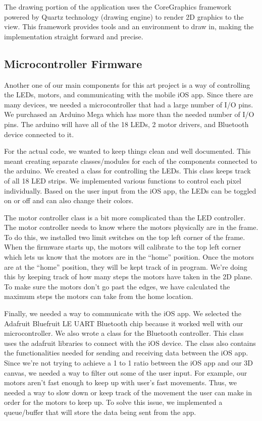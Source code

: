 \documentclass[11pt]{IEEEtran}
\begin{document}
The drawing portion of the application uses the CoreGraphics framework powered by Quartz technology (drawing engine) to render 2D graphics to the view. This framework provides tools and an environment to draw in, making the implementation straight forward and precise.

\subsection{Microcontroller Firmware}
Another one of our main components for this art project is a way of controlling the LEDs, motors, and communicating with the mobile iOS app. Since there are many devices, we needed a microcontroller that had a large number of I/O pins. We purchased an Arduino Mega which has more than the needed number of I/O pins. The arduino will have all of the 18 LEDs, 2 motor drivers, and Bluetooth device connected to it.

For the actual code, we wanted to keep things clean and well documented. This meant creating separate classes/modules for each of the components connected to the arduino. We created a class for controlling the LEDs. This class keeps track of all 18 LED strips. We implemented various functions to control each pixel individually. Based on the user input from the iOS app, the LEDs can be toggled on or off and can also change their colors.

The motor controller class is a bit more complicated than the LED controller. The motor controller needs to know where the motors physically are in the frame. To do this, we installed two limit switches on the top left corner of the frame. When the firmware starts up, the motors will calibrate to the top left corner which lets us know that the motors are in the “home” position. Once the motors are at the “home” position, they will be kept track of in program. We’re doing this by keeping track of how many steps the motors have taken in the 2D plane. To make sure the motors don’t go past the edges, we have calculated the maximum steps the motors can take from the home location. 

Finally, we needed a way to communicate with the iOS app. We selected the Adafruit Bluefruit LE UART Bluetooth chip because it worked well with our microcontroller. We also wrote a class for the Bluetooth controller. This class uses the adafruit libraries to connect with the iOS device. The class also contains the functionalities needed for sending and receiving data between the iOS app. Since we’re not trying to achieve a 1 to 1 ratio between the iOS app and our 3D canvas, we needed a way to filter out some of the user input. For example, our motors aren’t fast enough to keep up with user’s fast movements. Thus, we needed a way to slow down or keep track of the movement the user can make in order for the motors to keep up. To solve this issue, we implemented a queue/buffer that will store the data being sent from the app.
\end{document}
